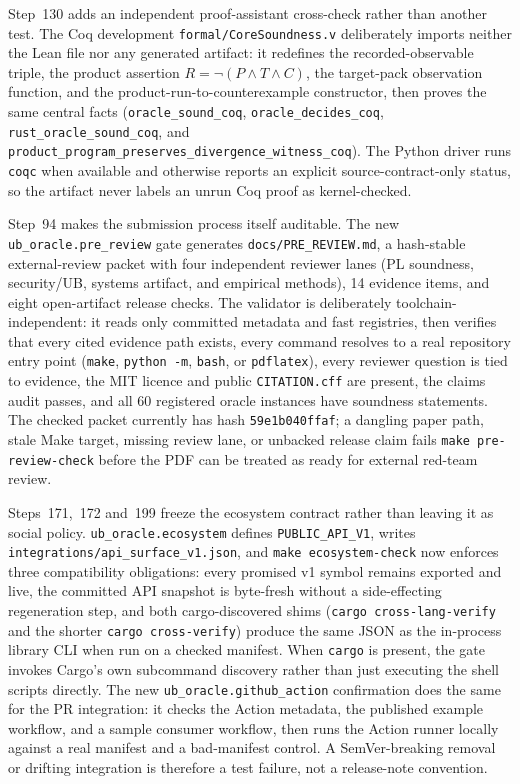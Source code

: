 \documentclass[10pt,a4paper]{article}
\begin{document}
Step~130 adds an independent proof-assistant cross-check rather than another
test.  The Coq development \texttt{formal/CoreSoundness.v} deliberately imports
neither the Lean file nor any generated artifact: it redefines the
recorded-observable triple, the product assertion \(R=\neg(P\wedge T\wedge C)\),
the target-pack observation function, and the product-run-to-counterexample
constructor, then proves the same central facts (\texttt{oracle\_sound\_coq},
\texttt{oracle\_decides\_coq}, \texttt{rust\_oracle\_sound\_coq}, and
\texttt{product\_program\_preserves\_divergence\_witness\_coq}).  The Python
driver runs \texttt{coqc} when available and otherwise reports an explicit
source-contract-only status, so the artifact never labels an unrun Coq proof as
kernel-checked.

Step~94 makes the submission process itself auditable.  The new
\texttt{ub\_oracle.pre\_review} gate generates
\texttt{docs/PRE\_REVIEW.md}, a hash-stable external-review packet with four
independent reviewer lanes (PL soundness, security/UB, systems artifact, and
empirical methods), 14 evidence items, and eight open-artifact release checks.
The validator is deliberately toolchain-independent: it reads only committed
metadata and fast registries, then verifies that every cited evidence path exists,
every command resolves to a real repository entry point
(\texttt{make}, \texttt{python -m}, \texttt{bash}, or \texttt{pdflatex}), every
reviewer question is tied to evidence, the MIT licence and public
\texttt{CITATION.cff} are present, the claims audit passes, and all 60 registered
oracle instances have soundness statements.  The checked packet currently has
hash \texttt{59e1b040ffaf}; a dangling paper path, stale Make target, missing
review lane, or unbacked release claim fails \texttt{make pre-review-check}
before the PDF can be treated as ready for external red-team review.

Steps~171,~172 and~199 freeze the ecosystem contract rather than leaving it as social
policy.  \texttt{ub\_oracle.ecosystem} defines \texttt{PUBLIC\_API\_V1}, writes
\texttt{integrations/api\_surface\_v1.json}, and \texttt{make ecosystem-check}
now enforces three compatibility obligations: every promised v1 symbol remains
exported and live, the committed API snapshot is byte-fresh without a
side-effecting regeneration step, and both cargo-discovered shims
(\texttt{cargo cross-lang-verify} and the shorter
\texttt{cargo cross-verify}) produce the same JSON as the in-process library CLI
when run on a checked manifest.  When \texttt{cargo} is present, the gate invokes
Cargo's own subcommand discovery rather than just executing the shell scripts
directly.  The new \texttt{ub\_oracle.github\_action} confirmation does the same
for the PR integration: it checks the Action metadata, the published example
workflow, and a sample consumer workflow, then runs the Action runner locally
against a real manifest and a bad-manifest control.  A SemVer-breaking removal or
drifting integration is therefore a test failure, not a release-note convention.
\end{document}
